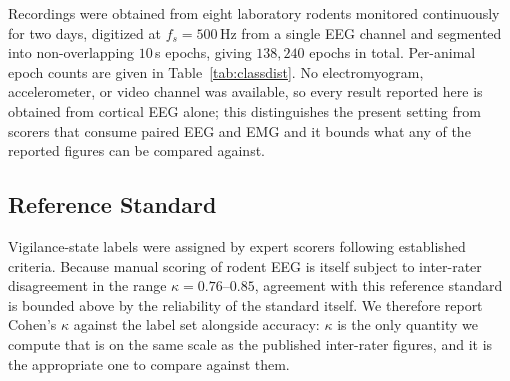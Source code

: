 Recordings were obtained from eight
laboratory rodents monitored continuously for two days, digitized at
$f_s = 500$\,Hz from a single EEG channel and segmented into
non-overlapping $10$\,s epochs, giving $138{,}240$ epochs in total.
Per-animal epoch counts are given in Table~\ref{tab:classdist}.
No electromyogram, accelerometer, or video channel was available, so
every result reported here is obtained from cortical EEG alone; this
distinguishes the present setting from scorers that consume paired
EEG and EMG \citep{jha2024_slumbernet, wang2023_intellisleepscorer}
and it bounds what any of the reported figures can be compared against.

\subsection{Reference Standard}
\label{subsec:labels}

Vigilance-state labels were assigned by
expert scorers following
established criteria. Because manual scoring of rodent EEG is itself
subject to inter-rater disagreement in the range $\kappa = 0.76$--$0.85$,
agreement with this reference standard is bounded above by the
reliability of the standard itself. We therefore report Cohen's $\kappa$
against the label set alongside accuracy: $\kappa$ is the only quantity
we compute that is on the same scale as the published inter-rater
figures, and it is the appropriate one to compare against them.

